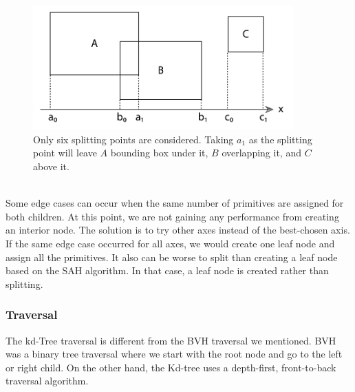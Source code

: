 \documentclass[11pt,a4paper]{article}
\begin{document}
\begin{figure}[H]	
     \centering
     \captionsetup{justification=centering,margin=2cm}
     \includegraphics[width=10cm]{images/kdtree/projected_bboxes.png}
     \caption{Only six splitting points are considered. Taking $a_1$ as the splitting point will leave $A$ bounding box under it, $B$ overlapping it, and $C$ above it. \protect\cite{Pharr2016}}
        \label{fig:dice}
\end{figure}

\noindent
\\
Some edge cases can occur when the same number of primitives are assigned for both children. At this point, we are not gaining any performance from creating an interior node. The solution is to try other axes instead of the best-chosen axis. If the same edge case occurred for all axes, we would create one leaf node and assign all the primitives. It also can be worse to split than creating a leaf node based on the SAH algorithm. In that case, a leaf node is created rather than splitting. 

\subsubsection{Traversal}
The kd-Tree traversal is different from the BVH traversal we mentioned. BVH was a binary tree traversal where we start with the root node and go to the left or right child. On the other hand, the Kd-tree uses a depth-first, front-to-back traversal algorithm. 
\end{document}
